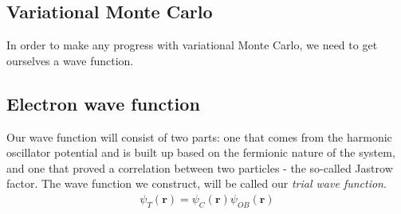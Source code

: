 \documentclass[11pt]{article}
\begin{document}
\subsection{Variational Monte Carlo}

In order to make any progress with variational Monte Carlo, we need to get ourselves a wave function.



\subsection{Electron wave function}
Our wave function will consist of two parts: one that comes from the harmonic oscillator potential and is built up based on the fermionic nature of the system, and one that proved a correlation between two particles - the so-called Jastrow factor. The wave function we construct, will be called our \textit{trial wave function}.
\begin{align}
	\psi_T(\mathbf{r}) = \psi_C(\mathbf{r})\psi_{OB}(\mathbf{r})
	\label{eq:WF_trial}
\end{align}
\end{document}
